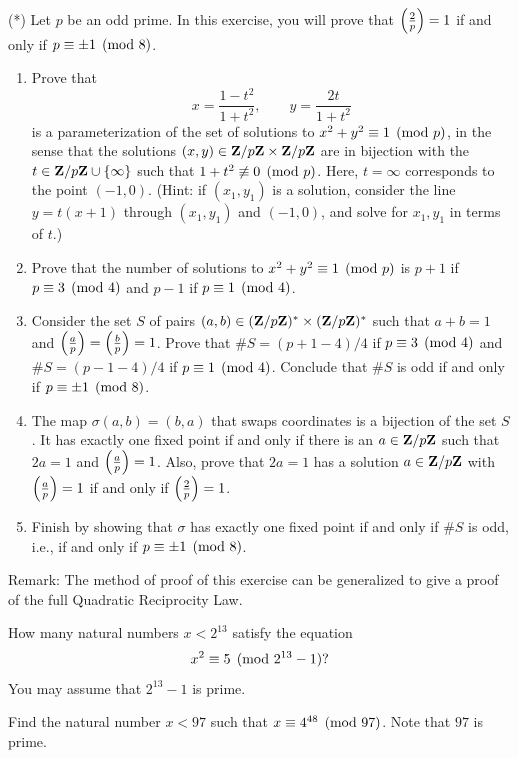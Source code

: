 \begin{exercises}
\item\label{ex:rec8} (*) Let $p$ be an odd prime. In this exercise, you
  will prove that $\left(\frac{2}{p}\right)=1$ if and only if $p\equiv
  \pm 1\pmod{8}$.
\begin{enumerate}
\item Prove that
$$
  x = \frac{1-t^2}{1+t^2}, \qquad y = \frac{2t}{1+t^2}
$$
is a parameterization of the set of solutions to $x^2+y^2\equiv 1\pmod{p}$,
in the sense that the solutions $(x,y)\in \mathbf{Z}/p\mathbf{Z}{} \times \mathbf{Z}/p\mathbf{Z}{}$ are in
bijection with the $t\in \mathbf{Z}/p\mathbf{Z}{} \cup\{\infty\}$ such that $1+t^2\not\equiv 0\pmod{p}$.
Here, $t=\infty$ corresponds to the point $(-1,0)$.
(Hint: if $(x_1,y_1)$ is a solution, consider the line $y=t(x+1)$
through $(x_1,y_1)$ and $(-1,0)$, and solve for $x_1, y_1$ in terms
of $t$.)
\item Prove that the number of solutions to $x^2+y^2\equiv 1\pmod{p}$
is $p+1$ if $p\equiv 3\pmod{4}$ and $p-1$ if $p\equiv 1\pmod{4}$.
\item Consider the set $S$ of pairs $(a,b)\in (\mathbf{Z}/p\mathbf{Z}{})^*\times (\mathbf{Z}/p\mathbf{Z}{})^*$ such
that $a+b=1$ and $\left(\frac{a}{p}\right)=\left(\frac{b}{p}\right)=1$.  Prove that
$\#S=(p+1-4)/4$ if $p\equiv 3\pmod{4}$ and $\#S = (p-1-4)/4$
if $p\equiv 1\pmod{4}$.  Conclude that $\#S$ is odd if and only if
$p\equiv \pm 1\pmod{8}$.
\item The map $\sigma(a,b)=(b,a)$ that swaps coordinates is a
  bijection of the set $S$. It has exactly one fixed point if and
  only if there is an $a\in\mathbf{Z}/p\mathbf{Z}{}$ such that $2a=1$ and $\left(\frac{a}{p}\right)=1$.
  Also, prove that $2a=1$ has a solution $a\in\mathbf{Z}/p\mathbf{Z}{}$ with $\left(\frac{a}{p}\right)=1$
if and only if $\left(\frac{2}{p}\right)=1$.
\item Finish by showing that $\sigma$ has exactly one fixed point
if and only if $\#S$ is odd, i.e., if and only if
$p\equiv \pm 1\pmod{8}$.
\end{enumerate}
Remark: The method of proof of this exercise can be generalized to give a
proof of the full Quadratic Reciprocity Law.

\item\label{ex:rec9} How many natural numbers $x < 2^{13}$ satisfy the
  equation
  $$
  x^2\equiv 5\pmod{2^{13}-1}? $$
  You may assume that $2^{13}-1$ is prime.

\item\label{ex:rec10} Find the natural number $x<97$ such that $x\equiv
  4^{48}\pmod{97}$.  Note that $97$ is prime.



\end{exercises}
